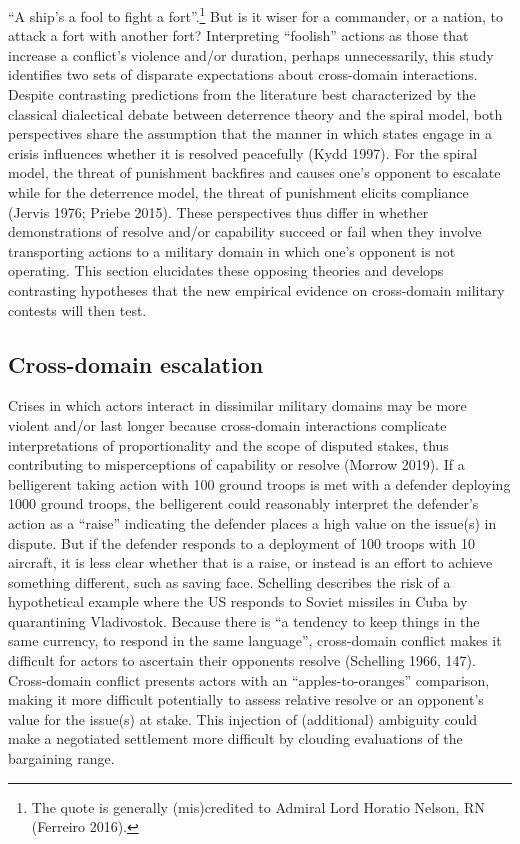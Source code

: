 \documentclass[
]{article}
\begin{document}
``A ship's a fool to fight a fort''.\footnote{The quote is generally (mis)credited to Admiral Lord Horatio Nelson, RN (Ferreiro 2016).} But is it wiser for a commander, or a nation, to attack a fort with another fort? Interpreting ``foolish'' actions as those that increase a conflict's violence and/or duration, perhaps unnecessarily, this study identifies two sets of disparate expectations about cross-domain interactions. Despite contrasting predictions from the literature best characterized by the classical dialectical debate between deterrence theory and the spiral model, both perspectives share the assumption that the manner in which states engage in a crisis influences whether it is resolved peacefully (Kydd 1997). For the spiral model, the threat of punishment backfires and causes one's opponent to escalate while for the deterrence model, the threat of punishment elicits compliance (Jervis 1976; Priebe 2015). These perspectives thus differ in whether demonstrations of resolve and/or capability succeed or fail when they involve transporting actions to a military domain in which one's opponent is not operating. This section elucidates these opposing theories and develops contrasting hypotheses that the new empirical evidence on cross-domain military contests will then test.

\hypertarget{cross-domain-escalation}{%
\subsection{Cross-domain escalation}\label{cross-domain-escalation}}

Crises in which actors interact in dissimilar military domains may be more violent and/or last longer because cross-domain interactions complicate interpretations of proportionality and the scope of disputed stakes, thus contributing to misperceptions of capability or resolve (Morrow 2019). If a belligerent taking action with 100 ground troops is met with a defender deploying 1000 ground troops, the belligerent could reasonably interpret the defender's action as a ``raise'' indicating the defender places a high value on the issue(s) in dispute. But if the defender responds to a deployment of 100 troops with 10 aircraft, it is less clear whether that is a raise, or instead is an effort to achieve something different, such as saving face. Schelling describes the risk of a hypothetical example where the US responds to Soviet missiles in Cuba by quarantining Vladivostok. Because there is ``a tendency to keep things in the same currency, to respond in the same language'', cross-domain conflict makes it difficult for actors to ascertain their opponents resolve (Schelling 1966, 147). Cross-domain conflict presents actors with an ``apples-to-oranges'' comparison, making it more difficult potentially to assess relative resolve or an opponent's value for the issue(s) at stake. This injection of (additional) ambiguity could make a negotiated settlement more difficult by clouding evaluations of the bargaining range.
\end{document}
